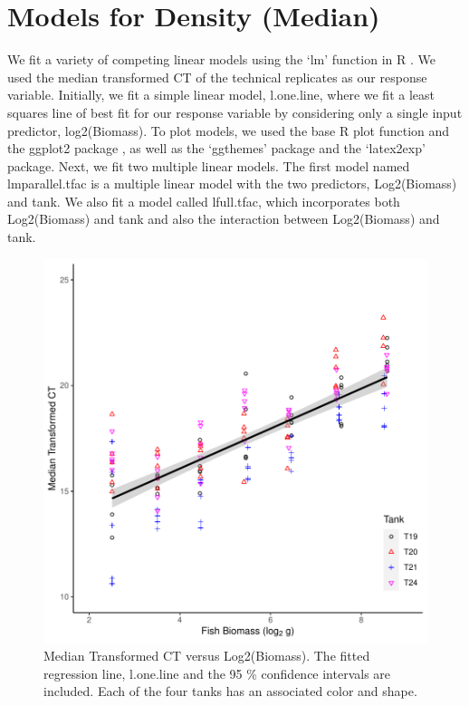 \section{Models for Density (Median)}

We fit a variety of competing linear models using the `lm' function in R \citep{Rprogram}. We used the median transformed CT of the technical replicates as our response variable. Initially, we fit a simple linear model, l.one.line, where we fit a least squares line of best fit for our response variable by considering only a single input predictor, log2(Biomass). To plot models, we used the base R plot function and the ggplot2 package \citep{ggplot}, as well as the `ggthemes' package \citep{ggthemes} and the `latex2exp' package\citep{latextoexp}. Next, we fit two multiple linear models. The first model named lmparallel.tfac is a multiple linear model with the two predictors, Log2(Biomass) and tank. We also fit a model called lfull.tfac, which incorporates both Log2(Biomass) and tank and also the interaction between Log2(Biomass) and tank.


\begin{figure}[H]
\includegraphics{Chapter3Images/ggplotnew.pdf}
\caption{ Median Transformed CT versus Log2(Biomass). The fitted regression line, l.one.line and the 95 \% confidence intervals are included. Each of the four tanks has an associated color and shape.}
\label{fig:medct1}
\end{figure}

